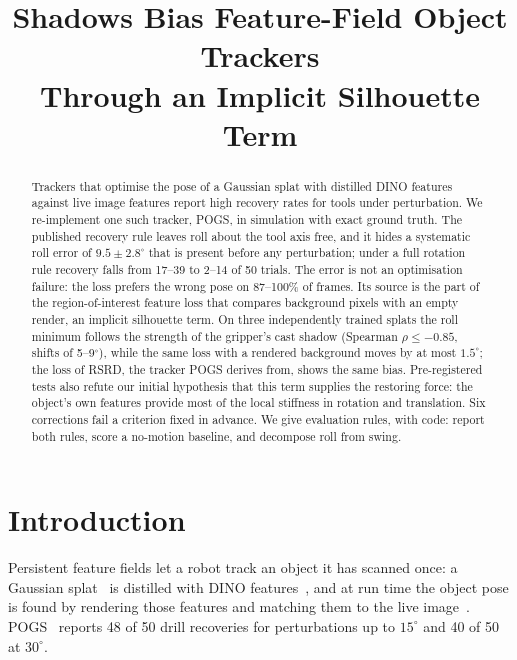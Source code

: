 \documentclass[conference]{IEEEtran}
\title{Shadows Bias Feature-Field Object Trackers\\Through an Implicit Silhouette Term}
\author{\IEEEauthorblockN{[Author names]}\IEEEauthorblockA{[Affiliation]}}
\begin{document}
\maketitle

\begin{abstract}
Trackers that optimise the pose of a Gaussian splat with distilled DINO features against live image features
report high recovery rates for tools under perturbation. We re-implement one such tracker, POGS, in simulation
with exact ground truth. The published recovery rule leaves roll about the tool axis free, and it hides a
systematic roll error of $9.5 \pm 2.8^\circ$ that is present before any perturbation; under a full rotation rule
recovery falls from 17--39 to 2--14 of 50 trials. The error is not an optimisation failure: the loss prefers the
wrong pose on 87--100\% of frames. Its source is the part of the region-of-interest feature loss that compares
background pixels with an empty render, an implicit silhouette term. On three independently trained splats the
roll minimum follows the strength of the gripper's cast shadow (Spearman $\rho \leq -0.85$, shifts of 5--9$^\circ$),
while the same loss with a rendered background moves by at most $1.5^\circ$; the loss of RSRD, the tracker POGS
derives from, shows the same bias. Pre-registered tests also refute our initial hypothesis that this term supplies
the restoring force: the object's own features provide most of the local stiffness in rotation and translation.
Six corrections fail a criterion fixed in advance. We give evaluation rules, with code: report both rules, score a
no-motion baseline, and decompose roll from swing.
\end{abstract}

\section{Introduction}
Persistent feature fields let a robot track an object it has scanned once: a Gaussian splat~\cite{kerbl2023gaussian}
is distilled with DINO features~\cite{oquab2024dinov2}, and at run time the object pose is found by rendering
those features and matching them to the live image~\cite{kerr2024rsrd,yu2025pogs}. POGS~\cite{yu2025pogs} reports
48 of 50 drill recoveries for perturbations up to $15^\circ$ and 40 of 50 at $30^\circ$.
\end{document}
